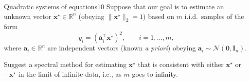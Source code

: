 \documentclass{article}
\begin{document}
\begin{problem}{Quadratic systems of equations}{10}
Suppose that our goal is to estimate an unknown vector $\bm{x}^{\star} \in \mathbb{R}^n$ (obeying $\|\bm{x}^{\star}\|_2=1$) based on $m$ i.i.d.~samples of the form
	\[
		y_i = ( \bm{a}_i^{\top} \bm{x}^{\star} )^2, \qquad i=1,\ldots,m,
	\]
	where $\bm{a}_i\in \mathbb{R}^n$ are independent vectors (known {\em a priori}) obeying $\bm{a}_i \sim \mathcal{N}(\bm{0},\bm{I}_n)$. 

	Suggest a spectral method for estimating $\bm{x}^{\star}$ that is consistent with either $\bm{x}^{\star}$ or $-\bm{x}^{\star}$ in the limit of infinite data, i.e., as $m$ goes to infinity.




\end{problem}
\end{document}
